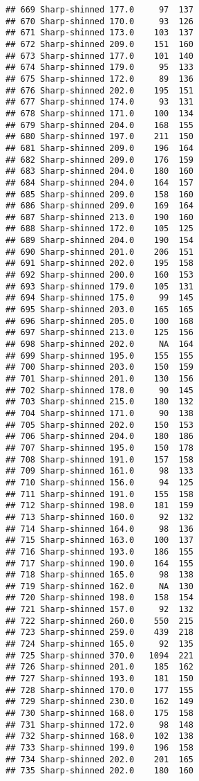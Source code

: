 \documentclass[
]{article}
\begin{document}
\begin{verbatim}
## 669 Sharp-shinned 177.0     97  137
## 670 Sharp-shinned 170.0     93  126
## 671 Sharp-shinned 173.0    103  137
## 672 Sharp-shinned 209.0    151  160
## 673 Sharp-shinned 177.0    101  140
## 674 Sharp-shinned 179.0     95  133
## 675 Sharp-shinned 172.0     89  136
## 676 Sharp-shinned 202.0    195  151
## 677 Sharp-shinned 174.0     93  131
## 678 Sharp-shinned 171.0    100  134
## 679 Sharp-shinned 204.0    168  155
## 680 Sharp-shinned 197.0    211  150
## 681 Sharp-shinned 209.0    196  164
## 682 Sharp-shinned 209.0    176  159
## 683 Sharp-shinned 204.0    180  160
## 684 Sharp-shinned 204.0    164  157
## 685 Sharp-shinned 209.0    158  160
## 686 Sharp-shinned 209.0    169  164
## 687 Sharp-shinned 213.0    190  160
## 688 Sharp-shinned 172.0    105  125
## 689 Sharp-shinned 204.0    190  154
## 690 Sharp-shinned 201.0    206  151
## 691 Sharp-shinned 202.0    195  158
## 692 Sharp-shinned 200.0    160  153
## 693 Sharp-shinned 179.0    105  131
## 694 Sharp-shinned 175.0     99  145
## 695 Sharp-shinned 203.0    165  165
## 696 Sharp-shinned 205.0    100  168
## 697 Sharp-shinned 213.0    125  156
## 698 Sharp-shinned 202.0     NA  164
## 699 Sharp-shinned 195.0    155  155
## 700 Sharp-shinned 203.0    150  159
## 701 Sharp-shinned 201.0    130  156
## 702 Sharp-shinned 178.0     90  145
## 703 Sharp-shinned 215.0    180  132
## 704 Sharp-shinned 171.0     90  138
## 705 Sharp-shinned 202.0    150  153
## 706 Sharp-shinned 204.0    180  186
## 707 Sharp-shinned 195.0    150  178
## 708 Sharp-shinned 191.0    157  158
## 709 Sharp-shinned 161.0     98  133
## 710 Sharp-shinned 156.0     94  125
## 711 Sharp-shinned 191.0    155  158
## 712 Sharp-shinned 198.0    181  159
## 713 Sharp-shinned 160.0     92  132
## 714 Sharp-shinned 164.0     98  136
## 715 Sharp-shinned 163.0    100  137
## 716 Sharp-shinned 193.0    186  155
## 717 Sharp-shinned 190.0    164  155
## 718 Sharp-shinned 165.0     98  138
## 719 Sharp-shinned 162.0     NA  130
## 720 Sharp-shinned 198.0    158  154
## 721 Sharp-shinned 157.0     92  132
## 722 Sharp-shinned 260.0    550  215
## 723 Sharp-shinned 259.0    439  218
## 724 Sharp-shinned 165.0     92  135
## 725 Sharp-shinned 370.0   1094  221
## 726 Sharp-shinned 201.0    185  162
## 727 Sharp-shinned 193.0    181  150
## 728 Sharp-shinned 170.0    177  155
## 729 Sharp-shinned 230.0    162  149
## 730 Sharp-shinned 168.0    175  158
## 731 Sharp-shinned 172.0     98  148
## 732 Sharp-shinned 168.0    102  138
## 733 Sharp-shinned 199.0    196  158
## 734 Sharp-shinned 202.0    201  165
## 735 Sharp-shinned 202.0    180  160

\end{verbatim}
\end{document}
